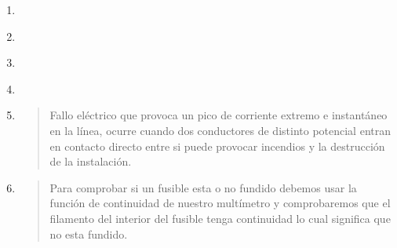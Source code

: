\documentclass[spanish,openany]{report}
\begin{document}
\begin{enumerate}
  \begin{quote}
	  Debemos de tener en cuenta la curva de actuación que necesitamos y el amperaje que puede soportar el magnetotérmico.
  \end{quote}

  \item {}
  \begin{quote}
  \end{quote}

  \item {}

  \begin{quote}
  \end{quote}

  \item {}

  \begin{quote}
  \end{quote}

  \item {}

  \begin{quote}
  \end{quote}

  \item {}

  \begin{quote}
	  Fallo eléctrico que provoca un pico de corriente extremo e instantáneo en la línea, ocurre cuando dos conductores de 
	  distinto potencial entran en contacto directo entre si puede provocar incendios y la destrucción de la instalación.
  \end{quote}

  \item {}

  \begin{quote}
	  Para comprobar si un fusible esta o no fundido debemos usar la función de continuidad de nuestro multímetro y comprobaremos que el filamento
	  del interior del fusible tenga continuidad lo cual significa que no esta fundido.
  \end{quote}


\end{enumerate}
\end{document}
